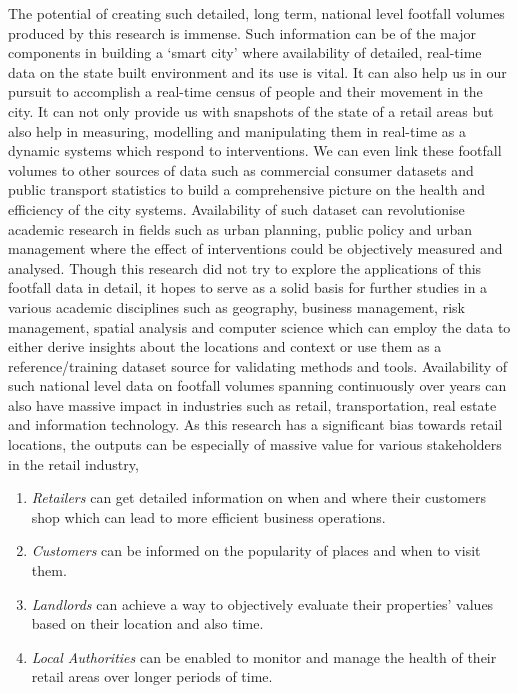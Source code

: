 
The potential of creating such detailed, long term, national level footfall volumes produced by this research is immense.
Such information can be of the major components in building a `smart city' where  availability of detailed, real-time data on the state built environment and its use is vital.
It can also help us in our pursuit to accomplish a real-time census of people and their movement in the city.
It can not only provide us with snapshots of the state of a retail areas but also help in measuring, modelling and manipulating them in real-time as a dynamic systems which respond to interventions.
We can even link these footfall volumes to other sources of data such as commercial consumer datasets and public transport statistics to build a comprehensive picture on the health and efficiency of the city systems.
Availability of such dataset can revolutionise academic research in fields such as urban planning, public policy and urban management where the effect of interventions could be objectively measured and analysed.
Though this research did not try to explore the applications of this footfall data in detail, it hopes to serve as a solid basis for further studies in a various academic disciplines such as geography, business management, risk management, spatial analysis and computer science which can employ the data to either derive insights about the locations and context or use them as a reference/training dataset source for validating methods and tools.
Availability of such national level data on footfall volumes spanning continuously over years can also have massive impact in industries such as retail, transportation, real estate and information technology.
As this research has a significant bias towards retail locations, the outputs can be especially of massive value for various stakeholders in the retail industry,
\begin{enumerate}[leftmargin=2em, rightmargin=0.5em]
  \itemsep-0.25em
  \item \textit{Retailers} can get detailed information on when and where their customers shop which can lead to more efficient business operations.
  \item \textit{Customers} can be informed on the popularity of places and when  to visit them.
  \item \textit{Landlords} can achieve a way to objectively evaluate their properties' values based on their location and also time.
  \item \textit{Local Authorities} can be enabled to monitor and manage the health of their retail areas over longer periods of time. 
\end{enumerate}

